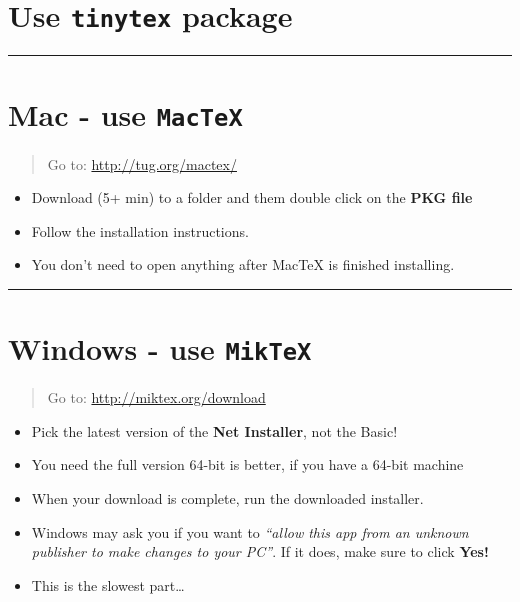 \documentclass[]{book}
\providecommand{\tightlist}{%
  \setlength{\itemsep}{0pt}\setlength{\parskip}{0pt}}
\theoremstyle{definition}
\theoremstyle{definition}
\theoremstyle{definition}
\theoremstyle{remark}
\begin{document}
\section{\texorpdfstring{Use \texttt{tinytex}
package}{Use tinytex package}}\label{use-tinytex-package}

\begin{center}\rule{0.5\linewidth}{\linethickness}\end{center}

\section{\texorpdfstring{Mac - use
\texttt{MacTeX}}{Mac - use MacTeX}}\label{mac---use-mactex}

\begin{quote}
Go to: \url{http://tug.org/mactex/}
\end{quote}

\begin{itemize}
\tightlist
\item
  Download (5+ min) to a folder and them double click on the \textbf{PKG
  file}
\item
  Follow the installation instructions.
\item
  You don't need to open anything after MacTeX is finished installing.
\end{itemize}

\begin{center}\rule{0.5\linewidth}{\linethickness}\end{center}

\section{\texorpdfstring{Windows - use
\texttt{MikTeX}}{Windows - use MikTeX}}\label{windows---use-miktex}

\begin{quote}
Go to: \url{http://miktex.org/download}
\end{quote}

\begin{itemize}
\tightlist
\item
  Pick the latest version of the \textbf{Net Installer}, not the Basic!
\item
  You need the full version 64-bit is better, if you have a 64-bit
  machine
\item
  When your download is complete, run the downloaded installer.
\item
  Windows may ask you if you want to \emph{``allow this app from an
  unknown publisher to make changes to your PC''}. If it does, make sure
  to click \textbf{Yes!}
\item
  This is the slowest part\ldots{}
\end{itemize}
\end{document}
